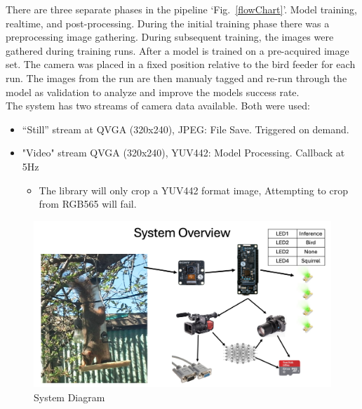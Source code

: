 \documentclass[conference]{IEEEtran}
\begin{document}
There are three separate phases in the pipeline `Fig.~\ref{flowChart}'. Model training, realtime, and post-processing. During the  initial training phase there was a preprocessing image gathering. During subsequent training, the images were gathered during training runs.
After a model is trained on a pre-acquired image set. The camera was placed in a fixed position relative to the bird feeder for each run. The images from the run are then manualy tagged and re-run through the model as validation to analyze and improve the models success rate. 
\\
The system has two streams of camera data available. Both were used:
\begin{itemize}
    \item “Still” stream at QVGA (320x240), JPEG: File Save. Triggered on demand.
    \item "Video" stream QVGA (320x240), YUV442: Model Processing. Callback at 5Hz
    \begin{itemize}
     	\item The library will only crop a YUV442 format image, Attempting to crop from RGB565 will fail.
     \end{itemize}
\end{itemize} 

\begin{figure}[htbp]
\centerline{\includegraphics[scale=.22]{blockDiagram.png}}
\caption{System Diagram}
\label{blockDiagram}
\end{figure}
\end{document}
